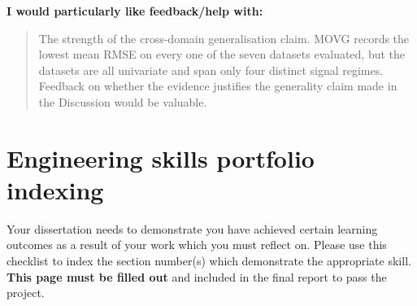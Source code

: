 \documentclass[a4paper,12pt]{article}
\begin{document}
\vspace{0.3cm}
\noindent\textbf{I would particularly like feedback/help with:}
\begin{quote}
The strength of the cross-domain generalisation claim. MOVG records the lowest mean RMSE on every one of the seven datasets evaluated, but the datasets are all univariate and span only four distinct signal regimes. Feedback on whether the evidence justifies the generality claim made in the Discussion would be valuable.
\end{quote}

\newpage
\section*{Engineering skills portfolio indexing}

Your dissertation needs to demonstrate you have achieved certain learning outcomes as a result of your work which you must reflect on. Please use this checklist to index the section number(s) which demonstrate the appropriate skill. \textbf{This page must be filled out} and included in the final report to pass the project.

\vspace{0.5cm}
\end{document}
